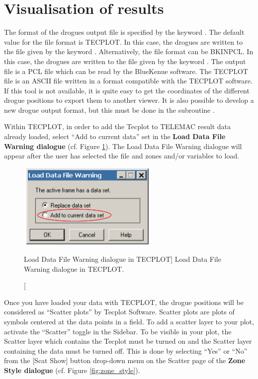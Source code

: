 \section{Visualisation of results}
\label{sec:droguesfile}
The format of the drogues output file is specified by the keyword . The default value for the file format is TECPLOT. In this case, the drogues are written to the file given by the keyword . Alternatively, the file format can be BKINPCL.  In this case, the drogues are written to the file given by the keyword . The output file is a PCL file which can be read by the BlueKenue software.  The TECPLOT file is an ASCII file written in a format compatible with the TECPLOT software. If this tool is not available, it is quite easy to get the coordinates of the different drogue positions to export them to another viewer. It is also possible to develop a new drogue output format, but this must be done in the subroutine .

Within TECPLOT, in order to add the Tecplot  to TELEMAC
result data already loaded, select ``Add to current data'' set in the
\textbf{Load Data File Warning dialogue} (cf. Figure \ref{fig:load_data}). The
Load Data File Warning dialogue will appear after the user has selected the
file and zones and/or variables to load.

\begin{figure}[H]%
\begin{center}
%
  \includegraphics[width=0.6\textwidth]{./graphics/load_data}
%
\end{center}
\caption
[Load Data File Warning dialogue in TECPLOT]
{Load Data File Warning dialogue in TECPLOT.}
\label{fig:load_data}
\end{figure}

Once you have loaded your data with TECPLOT, the drogue positions will be
considered as ``Scatter plots'' by Tecplot Software. Scatter plots are plots of
symbols centered at the data points in a field. To add a scatter layer to your
plot, activate the ``Scatter'' toggle in the Sidebar. To be visible in your
plot, the Scatter layer which contains the Tecplot  must be turned on and the Scatter layer containing the  data must be turned off. This is done by selecting ``Yes'' or ``No'' from
the [Scat Show] button drop-down menu on the Scatter page of the \textbf{Zone
Style dialogue} (cf. Figure \ref{fig:zone_style}).

